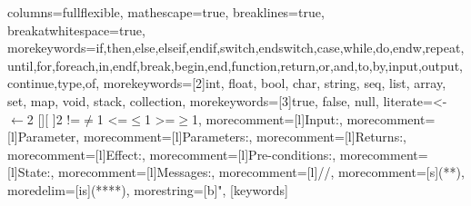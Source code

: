 %
%   
%
%   
%
%   
%

\usepackage{listings}
%
  {%
   columns=fullflexible,
   mathescape=true,
   breaklines=true,
   breakatwhitespace=true,
   morekeywords={if,then,else,elseif,endif,switch,endswitch,case,while,do,endw,repeat,until,for,foreach,in,endf,break,begin,end,function,return,or,and,to,by,input,output,continue,type,of},
   morekeywords=[2]{int, float, bool, char, string, seq, list, array, set, map, void, stack, collection},
   morekeywords=[3]{true, false, null},
   literate={<-}{{${}\leftarrow{}$}}{2} {[]}{[ ]}{2} {!=}{{${}\not={}$}}{1} {<=}{${}\leq{}$}{1} {>=}{${}\geq{}$}{1},
   morecomment=[l]{Input:},
   morecomment=[l]{Parameter},
   morecomment=[l]{Parameters:},
   morecomment=[l]{Returns:},
   morecomment=[l]{Effect:},
   morecomment=[l]{Pre-conditions:},
   morecomment=[l]{State:},
   morecomment=[l]{Messages:},
   morecomment=[l]{//},
   morecomment=[s]{(*}{*)},
   moredelim=[is]{(**}{**)},
   morestring=[b]",
  }
  [keywords]

